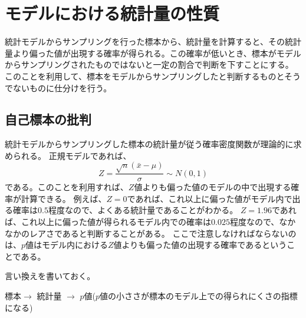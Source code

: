 \chapter{モデルにおける統計量の性質}
統計モデルからサンプリングを行った標本から、統計量を計算すると、その統計量より偏った値が出現する確率が得られる。この確率が低いとき、標本がモデルからサンプリングされたものではないと一定の割合で判断を下すことにする。
このことを利用して、標本をモデルからサンプリングしたと判断するものとそうでないものに仕分けを行う。




\section{自己標本の批判}
統計モデルからサンプリングした標本の統計量が従う確率密度関数が理論的に求められる。
正規モデルであれば、
\begin{equation*}
    Z = \frac{\sqrt{n}(\bar{x}-\mu)}{\sigma} \sim N(0,1)
\end{equation*}
である。このことを利用すれば、$Z$値よりも偏った値のモデルの中で出現する確率が計算できる。
例えば、$Z=0$であれば、これ以上に偏った値がモデル内で出る確率は$0.5$程度なので、よくある統計量であることがわかる。
$Z=1.96$であれば、これ以上に偏った値が得られるモデル内での確率は$0.025$程度なので、なかなかのレアさであると判断することがある。
ここで注意しなければならないのは、$p$値はモデル内における$Z$値よりも偏った値の出現する確率であるということである。

言い換えを書いておく。
\begin{center}
    標本$\rightarrow$ 統計量 $\rightarrow$ $p$値($p$値の小ささが標本のモデル上での得られにくさの指標になる)
\end{center}


